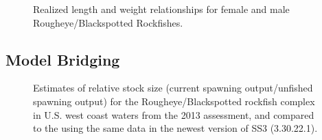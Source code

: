 \documentclass[
]{scrartcl}
\begin{document}
\begin{figure}[H]


\caption{\label{fig-LW2}Realized length and weight relationships for
female and male Rougheye/Blackspotted Rockfishes.}

\end{figure}%

\newpage

\subsection{Model Bridging}\label{model-bridging}

\begin{figure}[H]


\caption{\label{fig-RSS_2013}Estimates of relative stock size (current
spawning output/unfished spawning output) for the Rougheye/Blackspotted
rockfish complex in U.S. west coast waters from the 2013 assessment, and
compared to the using the same data in the newest version of SS3
(3.30.22.1).}

\end{figure}%
\end{document}
